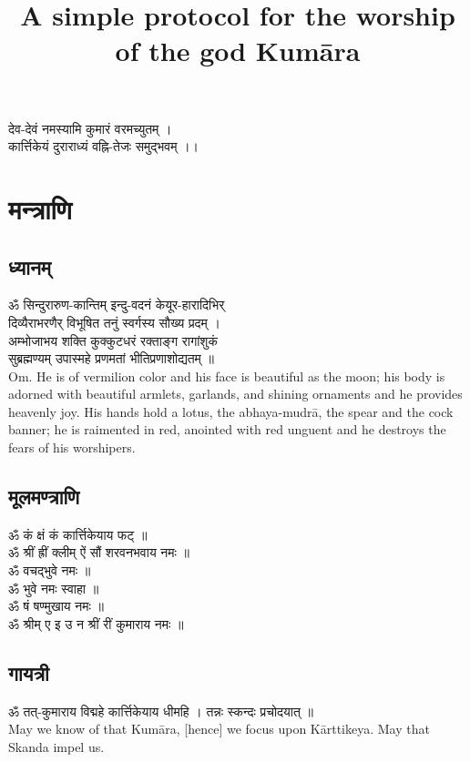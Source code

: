 \documentclass[13pt]{article}
\title{\textbf{A simple protocol for the worship of the god Kumāra}}
\author{}
\date{}
\begin{document}
\maketitle
\begin{center}
{\skt
देव-देवं नमस्यामि कुमारं वरमच्युतम् ।\\
कार्त्तिकेयं दुराराध्यं वह्नि-तेजः समुद्भवम् ।। 
}\\
 \end{center}
\section{{\skt मन्त्राणि}}
\subsection{{\skt ध्यानम् }}
{\skt ॐ सिन्दुरारुण-कान्तिम् इन्दु-वदनं केयूर-हारादिभिर् \\
दिव्यैराभरणैर् विभूषित तनुं स्वर्गस्य सौख्य प्रदम् ।\\ 
अम्भोजाभय शक्ति कुक्कुटधरं रक्ताङ्ग रागांशुकं \\
सुब्रह्मण्यम् उपास्महे प्रणमतां भीतिप्रणाशोद्यतम् ॥
}\\[8pt]
Om. He is of vermilion color and his face is beautiful as the moon; his body is adorned with beautiful armlets, garlands, and shining ornaments and he provides heavenly joy. His hands hold a lotus, the abhaya-mudrā, the spear and the cock banner; he is raimented in red, anointed with red unguent and he destroys the fears of his worshipers.
\subsection{{\skt मूलमण्त्राणि }}
{\normalsize{\skt ॐ कं क्षं कं कार्त्तिकेयाय फट् ॥\\
ॐ श्रीं ह्रीं क्लीम् ऐं सौं शरवनभवाय नमः ॥\\
ॐ वचद्भुवे नमः ॥\\
ॐ भुवे नमः स्वाहा ॥\\
ॐ षं षण्मुखाय नमः ॥\\
ॐ श्रीम् ए इ उ न श्रीं रीं कुमाराय नमः ॥
}\\}
\subsection{{\skt गायत्री }}
{\skt ॐ तत्-कुमाराय विद्महे कार्त्तिकेयाय धीमहि । तन्नः स्कन्दः प्रचोदयात् ॥
}\\[8pt]
May we know of that Kumāra, [hence] we focus upon Kārttikeya. May that Skanda impel us.
\end{document}
